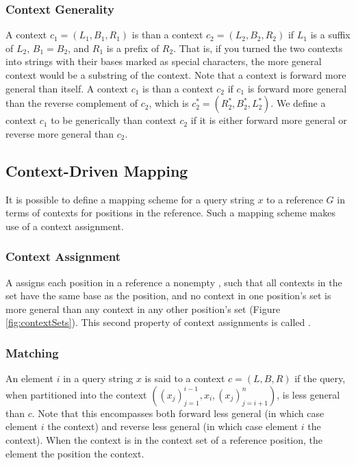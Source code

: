 \subsubsection{Context Generality}
A context $c_1 = (L_1, B_1, R_1)$ is  than a context $c_2 = (L_2, B_2, R_2)$ if $L_1$ is a suffix of $L_2$, $B_1 = B_2$, and $R_1$ is a prefix of $R_2$. That is, if you turned the two contexts into strings with their bases marked as special characters, the more general context would be a substring of the  context. Note that a context is forward more general than itself. A context $c_1$ is  than a context $c_2$ if $c_1$ is forward more general than the reverse complement of $c_2$, which is $c_2^* = (R_2^*, B_2^*, L_2^*)$. We define a context $c_1$ to be generically  than context $c_2$ if it is either forward more general or reverse more general than $c_2$. 

\subsection{Context-Driven Mapping}
It is possible to define a mapping scheme for a query string $x$ to a reference $G$ in terms of contexts for positions in the reference. Such a mapping scheme makes use of a context assignment.

\subsubsection{Context Assignment}
A  assigns each position in a reference a nonempty , such that all contexts in the set have the same base as the position, and no context in one position's set is more general than any context in any other position's set (Figure \ref{fig:contextSets}). This second property of context assignments is called .  

\subsubsection{Matching}
An element $i$ in a query string $x$ is said to  a context $c = (L, B, R)$ if the query, when partitioned into the context $((x_j)_{j=1}^{i-1}, x_i, (x_j)_{j=i+1}^n)$, is less general than $c$. Note that this encompasses both forward less general (in which case element $i$  the context) and reverse less general (in which case element $i$  the context). When the context is in the context set of a reference position, the element  the position  the context. 

